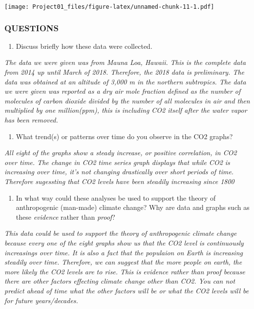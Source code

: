 \documentclass[]{article}
\providecommand{\tightlist}{%
  \setlength{\itemsep}{0pt}\setlength{\parskip}{0pt}}
\begin{document}
\texttt{[image: Project01\_files/figure-latex/unnamed-chunk-11-1.pdf]}

\subsubsection{QUESTIONS}\label{questions}

\begin{enumerate}
\def\labelenumi{\arabic{enumi})}
\tightlist
\item
  Discuss briefly how these data were collected.
\end{enumerate}

\emph{The data we were given was from Mauna Loa, Hawaii. This is the
complete data from 2014 up until March of 2018. Therefore, the 2018 data
is preliminary. The data was obtained at an altitude of 3,000 m in the
northern subtropics. The data we were given was reported as a dry air
mole fraction defined as the number of molecules of carbon dioxide
divided by the number of all molecules in air and then multiplied by one
million(ppm), this is including CO2 itself after the water vapor has
been removed.}

\begin{enumerate}
\def\labelenumi{\arabic{enumi})}
\setcounter{enumi}{1}
\tightlist
\item
  What trend(s) or patterns over time do you observe in the CO2 graphs?
\end{enumerate}

\emph{All eight of the graphs show a steady increase, or positive
correlation, in CO2 over time. The change in CO2 time series graph
displays that while CO2 is increasing over time, it's not changing
drastically over short periods of time. Therefore sugessting that CO2
levels have been steadily increasing since 1800}

\begin{enumerate}
\def\labelenumi{\arabic{enumi})}
\setcounter{enumi}{2}
\tightlist
\item
  In what way could these analyses be used to support the theory of
  anthropogenic (man-made) climate change? Why are data and graphs such
  as these \emph{evidence} rather than \emph{proof}?
\end{enumerate}

\emph{This data could be used to support the theory of anthropogenic
climate change because every one of the eight graphs show us that the
CO2 level is continuously increasings over time. It is also a fact that
the populaion on Earth is increasing steadily over time. Therefore, we
can suggest that the more people on earth, the more likely the CO2
levels are to rise. This is evidence rather than proof because there are
other factors effecting climate change other than CO2. You can not
predict ahead of time what the other factors will be or what the CO2
levels will be for future years/decades.}
\end{document}
